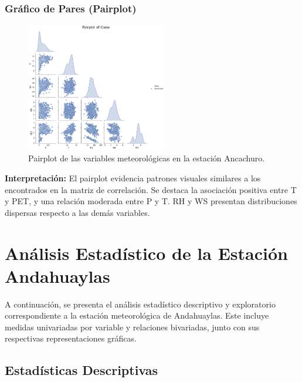 \subsubsection*{Gráfico de Pares (Pairplot)}
\begin{figure}[H]
\centering
\includegraphics[width=0.55\textwidth]{resultados/por_estacion_meteorologica/Ancachuro/pairplot.png}
\caption{Pairplot de las variables meteorológicas en la estación Ancachuro.}
\label{fig:ancachuro_pairplot}
\end{figure}
\textbf{Interpretación:} El pairplot evidencia patrones visuales similares a los encontrados en la matriz de correlación. Se destaca la asociación positiva entre T y PET, y una relación moderada entre P y T. RH y WS presentan distribuciones dispersas respecto a las demás variables.







\section{Análisis Estadístico de la Estación Andahuaylas}

A continuación, se presenta el análisis estadístico descriptivo y exploratorio correspondiente a la estación meteorológica de Andahuaylas. Este incluye medidas univariadas por variable y relaciones bivariadas, junto con sus respectivas representaciones gráficas.

\subsection{Estadísticas Descriptivas}

